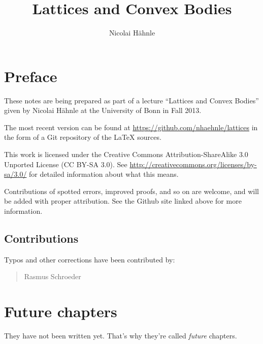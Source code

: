\documentclass[a4paper,10pt]{scrbook}
\title{Lattices and Convex Bodies}
\author{Nicolai Hähnle}
\theoremstyle{plain}
\theoremstyle{definition}
\begin{document}
\maketitle

\tableofcontents

\chapter*{Preface}

These notes are being prepared as part of a lecture ``Lattices and Convex Bodies''
given by Nicolai Hähnle at the University of Bonn in Fall 2013.

The most recent version can be found at \url{https://github.com/nhaehnle/lattices}
in the form of a Git repository of the \LaTeX{} sources.

This work is licensed under the Creative Commons Attribution-ShareAlike 3.0
Unported License (CC BY-SA 3.0). See \url{http://creativecommons.org/licenses/by-sa/3.0/}
for detailed information about what this means.

Contributions of spotted errors, improved proofs, and so on are welcome,
and will be added with proper attribution.
See the Github site linked above for more information.


\section*{Contributions}

Typos and other corrections have been contributed by:
\begin{quote}
  Rasmus Schroeder
\end{quote}










\chapter{Future chapters}
\label{chapter:not-yet}

They have not been written yet. That's why they're called \emph{future} chapters.





\end{document}
